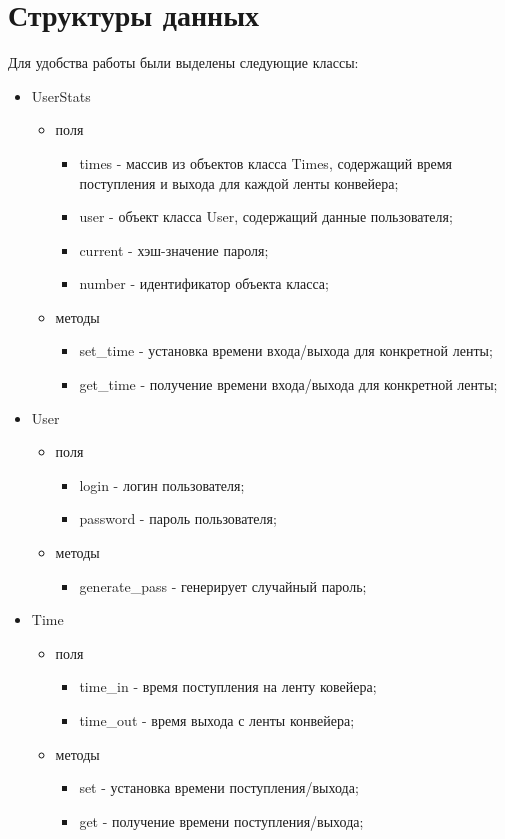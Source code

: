 \documentclass[12pt]{report}
\begin{document}
    \section{Структуры данных}
    Для удобства работы были выделены следующие классы:
    \begin{itemize}
    	\item UserStats
    	\begin{itemize}
    		\item поля
    		\begin{itemize}
    			\item times - массив из объектов класса Times, содержащий время поступления и выхода для каждой ленты конвейера;
    			\item user - объект класса User, содержащий данные пользователя;
    			\item current - хэш-значение пароля;
    			\item number - идентификатор объекта класса;
    		\end{itemize}
    		\item методы
    		\begin{itemize}
    			\item set\_time - установка времени входа/выхода для конкретной ленты;
    			\item get\_time - получение времени входа/выхода для конкретной ленты;
    		\end{itemize}
    	\end{itemize}
    	\item User
    	\begin{itemize}
    		\item поля
    		\begin{itemize}
    			\item login - логин пользователя;
    			\item password - пароль пользователя;
    		\end{itemize}
    		\item методы
    		\begin{itemize}
    			\item generate\_pass - генерирует случайный пароль;
    		\end{itemize}
    	\end{itemize}
    	\item Time
    	\begin{itemize}
    		\item поля
    		\begin{itemize}
    			\item time\_in - время поступления на ленту ковейера;
    			\item time\_out - время выхода с ленты конвейера;
    		\end{itemize}
    		\item методы
    		\begin{itemize}
    			\item set - установка времени поступления/выхода;
    			\item get - получение времени поступления/выхода;
    		\end{itemize}
    	\end{itemize}
    \end{itemize}
    
\end{document}

